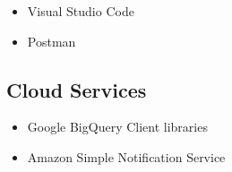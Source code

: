 \documentclass[letterpaper]{deedy-resume} %
\begin{document}
\begin{minipage}[t]{0.33\textwidth}
\begin{itemize}
\setlength\itemsep{-0.5em} %
\item Visual Studio Code
\item Postman
\end{itemize}


\vspace{-\topsep}

\subsection{Cloud Services}

\begin{itemize}
    \setlength\itemsep{-0.5em} %
    \item Google BigQuery Client libraries
    \item Amazon Simple Notification Service
\end{itemize}







\end{minipage} %
\hfill
\end{document}
